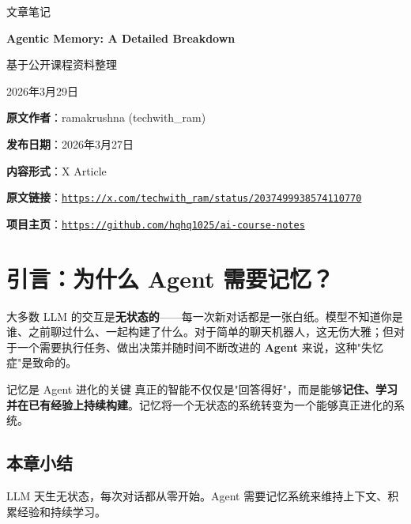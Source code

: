 \documentclass[a4paper]{article}
\newcommand{\notetitle}{Agentic Memory: A Detailed Breakdown}
\newcommand{\noteauthors}{基于公开课程资料整理}
\newcommand{\notedate}{2026年3月29日}
\newcommand{\videochannel}{ramakrushna (techwith\_ram)}
\newcommand{\videopublishdate}{2026年3月27日}
\newcommand{\videoduration}{X Article}
\newcommand{\videourl}{https://x.com/techwith_ram/status/2037499938574110770}
\newcommand{\repourl}{https://github.com/hqhq1025/ai-course-notes}
\begin{document}
\begin{titlepage}
\centering
{\Large 文章笔记\par}
\vspace{1.2cm}
{\huge\bfseries \notetitle\par}
\vspace{0.8cm}
{\large \noteauthors\par}
\vspace{0.3cm}
{\large \notedate\par}
\vspace{1.2cm}

\vfill
\begin{tcolorbox}[width=0.9\textwidth, colback=black!2!white, colframe=black!60, sharp corners]
\textbf{原文作者}：\videochannel\par
\textbf{发布日期}：\videopublishdate\par
\textbf{内容形式}：\videoduration\par
\textbf{原文链接}：\href{\videourl}{\nolinkurl{\videourl}}\par
\textbf{项目主页}：\href{\repourl}{\nolinkurl{\repourl}}\par
\end{tcolorbox}
\end{titlepage}

\tableofcontents
\newpage


\section{引言：为什么 Agent 需要记忆？}

大多数 LLM 的交互是\textbf{无状态的}——每一次新对话都是一张白纸。模型不知道你是谁、之前聊过什么、一起构建了什么。对于简单的聊天机器人，这无伤大雅；但对于一个需要执行任务、做出决策并随时间不断改进的 \textbf{Agent} 来说，这种"失忆症"是致命的。

\begin{importantbox}{记忆是 Agent 进化的关键}
真正的智能不仅仅是"回答得好"，而是能够\textbf{记住、学习并在已有经验上持续构建}。记忆将一个无状态的系统转变为一个能够真正进化的系统。
\end{importantbox}

\subsection{本章小结}

LLM 天生无状态，每次对话都从零开始。Agent 需要记忆系统来维持上下文、积累经验和持续学习。
\end{document}
